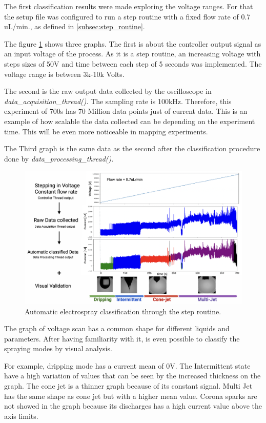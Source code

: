 The first classification results were made exploring the voltage ranges. 
For that the setup file was configured to run a step routine with a fixed flow rate of 0.7 uL/min., as defined in \ref{subsec:step_routine}. 

The figure \ref{fig:step_class} shows three graphs. 
The first is about the controller output signal as an input voltage of the process. As it is a step routine, an increasing voltage with steps sizes of 50V and time between each step of 5 seconds was implemented. The voltage range is between 3k-10k Volts.

The second is the raw output data collected by the oscilloscope in \emph{data\_acquisition\_thread()}. 
The sampling rate is 100kHz. Therefore, this experiment of 700s has 70 Million data points just of current data. 
This is an example of how scalable the data collected can be depending on the experiment time. This will be even more noticeable in mapping experiments.

The Third graph is the same data as the second after the classification procedure done by \emph{data\_processing\_thread()}. 


\begin{figure}[H]
    \center
    \includegraphics[width=16cm]{Figuras/may/step_class.png}
    \caption{Automatic electrospray classification through the step routine.}
    \label{fig:step_class}
\end{figure}

The graph of voltage scan has a common shape for different liquids and parameters. After having familiarity with it, is even possible to classify the spraying modes by visual analysis. 

For example, dripping mode has a current mean of 0V. The Intermittent state have a high variation of values that can be seen by the increased thickness on the graph. The cone jet is a thinner graph because of its constant signal. Multi Jet  has the same shape as cone jet but with a higher mean value. Corona sparks are not showed in the graph because its discharges has a high current value above the axis limits.



